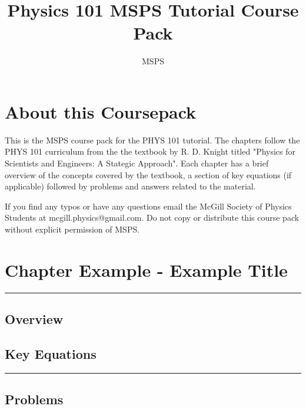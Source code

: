 \documentclass[a4paper,12pt]{article}
\title{Physics 101 MSPS Tutorial Course Pack}
\author{MSPS}
\begin{document}
\maketitle
\pagebreak
\tableofcontents

\pagebreak
\section*{About this Coursepack}

\hspace{5mm}This is the MSPS course pack for the PHYS 101 tutorial. The chapters follow the PHYS 101 curriculum from the the textbook by R. D. Knight titled "Physics for Scientists and Engineers: A Stategic Approach". Each chapter has a brief overview of the concepts covered by the textbook, a section of key equations (if applicable) followed by problems and answers related to the material. 

If you find any typos or have any questions email the McGill Society of Physics Students at mcgill.physics@gmail.com. Do not copy or distribute this course pack without explicit permission of MSPS.  

\pagebreak


\noindent\section*{Chapter Example - Example Title}
\rule{\linewidth}{1pt}
\subsection*{Overview}



\subsection*{Key Equations} 



\vspace{4mm}
\begin{center}
  \rule{6cm}{0.5pt}
\end{center}

\subsection*{Problems}
\end{document}
